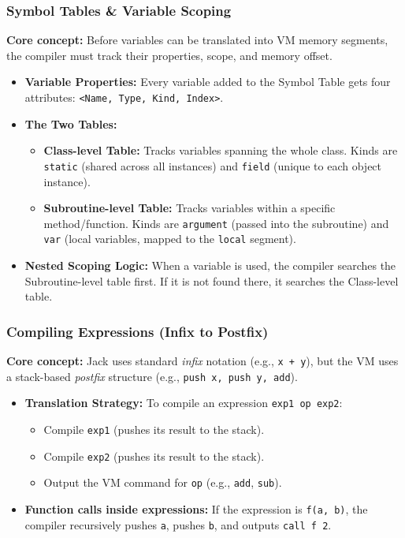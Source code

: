 \documentclass[12pt,a4paper]{article}
\begin{document}
\subsubsection*{Symbol Tables \& Variable Scoping}
\textbf{Core concept:} Before variables can be translated into VM memory segments, the compiler must track their properties, scope, and memory offset.
\begin{itemize}
    \item \textbf{Variable Properties:} Every variable added to the Symbol Table gets four attributes: \texttt{<Name, Type, Kind, Index>}.
    \item \textbf{The Two Tables:}
    \begin{itemize}
        \item \textbf{Class-level Table:} Tracks variables spanning the whole class. Kinds are \texttt{static} (shared across all instances) and \texttt{field} (unique to each object instance).
        \item \textbf{Subroutine-level Table:} Tracks variables within a specific method/function. Kinds are \texttt{argument} (passed into the subroutine) and \texttt{var} (local variables, mapped to the \texttt{local} segment).
    \end{itemize}
    \item \textbf{Nested Scoping Logic:} When a variable is used, the compiler searches the Subroutine-level table first. If it is not found there, it searches the Class-level table. 
\end{itemize}

\subsubsection*{Compiling Expressions (Infix to Postfix)}
\textbf{Core concept:} Jack uses standard \textit{infix} notation (e.g., \texttt{x + y}), but the VM uses a stack-based \textit{postfix} structure (e.g., \texttt{push x, push y, add}).
\begin{itemize}
    \item \textbf{Translation Strategy:} To compile an expression \texttt{exp1 op exp2}:
    \begin{itemize}
        \item Compile \texttt{exp1} (pushes its result to the stack).
        \item Compile \texttt{exp2} (pushes its result to the stack).
        \item Output the VM command for \texttt{op} (e.g., \texttt{add}, \texttt{sub}).
    \end{itemize}
    \item \textbf{Function calls inside expressions:} If the expression is \texttt{f(a, b)}, the compiler recursively pushes \texttt{a}, pushes \texttt{b}, and outputs \texttt{call f 2}.
\end{itemize}
\end{document}
